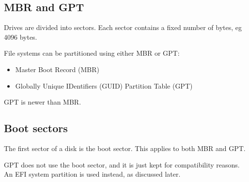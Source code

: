 
\subsection{MBR and GPT}

Drives are divided into sectors. Each sector contains a fixed number of bytes, eg 4096 bytes.

File systems can be partitioned using either MBR or GPT:

\begin{itemize}
  \item Master Boot Record (MBR)
  \item Globally Unique IDentifiers (GUID) Partition Table (GPT)
\end{itemize}
GPT is newer than MBR.

\subsection{Boot sectors}

The first sector of a disk is the boot sector. This applies to both MBR and GPT.

GPT does not use the boot sector, and it is just kept for compatibility reasons. An EFI system partition is used instead, as discussed later.

